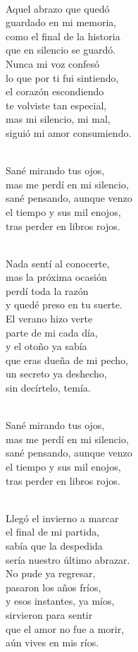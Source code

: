 \begin{lyrics}
\\
Aquel abrazo que quedó\\
guardado en mi memoria,\\
como el final de la historia\\
que en silencio se guardó.\\
Nunca mi voz confesó\\
lo que por ti fui sintiendo,\\
el corazón escondiendo\\
te volviste tan especial,\\
mas mi silencio, mi mal,\\
siguió mi amor consumiendo.

\\
Sané mirando tus ojos,\\
mas me perdí en mi silencio,\\
sané pensando, aunque venzo\\
el tiempo y sus mil enojos,\\
tras perder en libros rojos.

\\
Nada sentí al conocerte,\\
mas la próxima ocasión\\
perdí toda la razón\\
y quedé preso en tu suerte.\\
El verano hizo verte\\
parte de mi cada día,\\
y el otoño ya sabía\\
que eras dueña de mi pecho,\\
un secreto ya deshecho,\\
sin decírtelo, temía.

\\
Sané mirando tus ojos,\\
mas me perdí en mi silencio,\\
sané pensando, aunque venzo\\
el tiempo y sus mil enojos,\\
tras perder en libros rojos.

\\
Llegó el invierno a marcar\\
el final de mi partida,\\
sabía que la despedida\\
sería nuestro último abrazar.\\
No pude ya regresar,\\
pasaron los años fríos,\\
y esos instantes, ya míos,\\
sirvieron para sentir\\
que el amor no fue a morir,\\
aún vives en mis ríos.


\end{lyrics}
